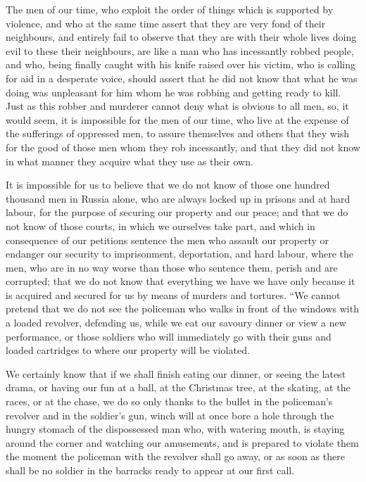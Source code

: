 \documentclass{book}
\begin{document}
The men of our time, who exploit the order of things which is supported by violence, and who at the same time assert that they are very fond of their neighbours, and entirely fail to observe that they are with their whole lives doing evil to these their neighbours, are like a man who has incessantly robbed people, and who, being finally caught with his knife raised over his victim, who is calling for aid in a desperate voice, should assert that he did not know that what he was doing was unpleasant for him whom he was robbing and getting ready to kill. Just as this robber and murderer cannot deny what is obvious to all men, so, it would seem, it is impossible for the men of our time, who live at the expense of the sufferings of oppressed men, to assure themselves and others that they wish for the good of those men whom they rob incessantly, and that they did not know in what manner they acquire what they use as their own.

It is impossible for us to believe that we do not know of those one hundred thousand men in Russia alone, who are always locked up in prisons and at hard labour, for the purpose of securing our property and our peace; and that we do not know of those courts, in which we ourselves take part, and which in consequence of our petitions sentence the men who assault our property or endanger our security to imprisonment, deportation, and hard labour, where the men, who are in no way worse than those who sentence them, perish and are corrupted; that we do not know that everything we have we have only because it is acquired and secured for us by means of murders and tortures. “We cannot pretend that we do not see the policeman who walks in front of the windows with a loaded revolver, defending us, while we eat our savoury dinner or view a new performance, or those soldiers who will immediately go with their guns and loaded cartridges to where our property will be violated.

We certainly know that if we shall finish eating our dinner, or seeing the latest drama, or having our fun at a ball, at the Christmas tree, at the skating, at the races, or at the chase, we do so only thanks to the bullet in the policeman’s revolver and in the soldier’s gun, winch will at once bore a hole through the hungry stomach of the dispossessed man who, with watering mouth, is staying around the corner and watching our amusements, and is prepared to violate them the moment the policeman with the revolver shall go away, or as soon as there shall be no soldier in the barracks ready to appear at our first call.
\end{document}
